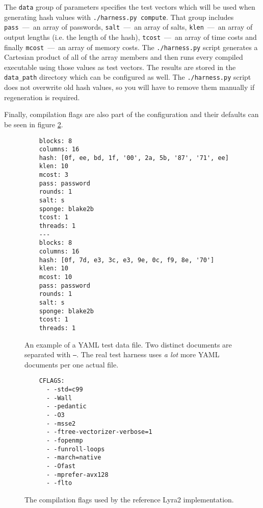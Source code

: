 The \texttt{data} group of parameters specifies the test vectors which will be used when generating hash values with \texttt{./harness.py compute}. That group includes \texttt{pass}~---~an array of passwords, \texttt{salt}~---~an array of salts, \texttt{klen}~---~an array of output lengths (i.e. the length of the hash), \texttt{tcost}~---~an array of time costs and finally \texttt{mcost}~---~an array of memory costs. The \texttt{./harness.py} script generates a Cartesian product of all of the array members and then runs every compiled executable using those values as test vectors. The results are stored in the \texttt{data_path} directory which can be configured as well. The \texttt{./harness.py} script does not overwrite old hash values, so you will have to remove them manually if regeneration is required.

Finally, compilation flags are also part of the configuration and their defaults can be seen in figure \ref{fig:compile-flags}.

\begin{figure}
    \begin{verbatim}
    blocks: 8
    columns: 16
    hash: [0f, ee, bd, 1f, '00', 2a, 5b, '87', '71', ee]
    klen: 10
    mcost: 3
    pass: password
    rounds: 1
    salt: s
    sponge: blake2b
    tcost: 1
    threads: 1
    ---
    blocks: 8
    columns: 16
    hash: [0f, 7d, e3, 3c, e3, 9e, 0c, f9, 8e, '70']
    klen: 10
    mcost: 10
    pass: password
    rounds: 1
    salt: s
    sponge: blake2b
    tcost: 1
    threads: 1
    \end{verbatim}
    \caption{An example of a YAML test data file. Two distinct documents are separated with \texttt{---}. The real test harness uses \emph{a lot} more YAML documents per one actual file.}
    \label{fig:yaml-data}
  \end{figure}


\begin{figure}
    \begin{verbatim}
    CFLAGS:
      - -std=c99
      - -Wall
      - -pedantic
      - -O3
      - -msse2
      - -ftree-vectorizer-verbose=1
      - -fopenmp
      - -funroll-loops
      - -march=native
      - -Ofast
      - -mprefer-avx128
      - -flto
      \end{verbatim}
      \caption{The compilation flags used by the reference Lyra2 implementation.}
      \label{fig:compile-flags}
  \end{figure}
